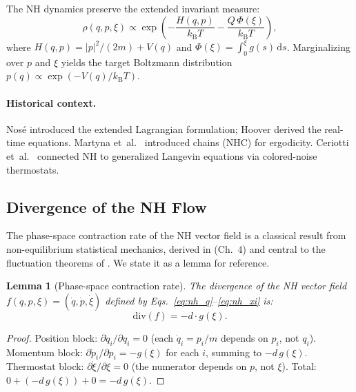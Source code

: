 \documentclass[11pt]{article}
\newtheorem{lemma}[theorem]{Lemma}
\newcommand{\divergence}{\mathrm{div}}
\newcommand{\dd}{\mathrm{d}}
\newcommand{\kT}{k_{\mathrm{B}}T}
\begin{document}
The NH dynamics preserve the extended invariant measure:
\begin{equation}
  \rho(q, p, \xi) \propto
    \exp\!\left(-\frac{H(q,p)}{\kT} - \frac{Q\,\Phi(\xi)}{\kT}\right),
  \label{eq:nh_invariant}
\end{equation}
where $H(q,p) = |p|^2/(2m) + V(q)$ and $\Phi(\xi) = \int_0^\xi g(s)\,\dd s$.
Marginalizing over $p$ and $\xi$ yields the target Boltzmann distribution
$p(q) \propto \exp(-V(q)/\kT)$.

\paragraph{Historical context.}
Nos\'{e} \citep{nose1984unified} introduced the extended Lagrangian formulation;
Hoover \citep{hoover1985canonical} derived the real-time equations. Martyna
et~al.\ \citep{martyna1992nose} introduced chains (NHC) for ergodicity.
Ceriotti et~al.\ \citep{ceriotti2010colored} connected NH to generalized
Langevin equations via colored-noise thermostats.

\subsection{Divergence of the NH Flow}
\label{sec:div_identity}

The phase-space contraction rate of the NH vector field is a classical result
from non-equilibrium statistical mechanics, derived in
\citet{tuckerman2010statistical} (Ch.~4) and central to the fluctuation
theorems of \citet{evans2002fluctuation}. We state it as a lemma for
reference.

\begin{lemma}[Phase-space contraction rate]
\label{lem:exact_div}
The divergence of the NH vector field
$f(q, p, \xi) = (\dot{q}, \dot{p}, \dot{\xi})$ defined by
Eqs.~\eqref{eq:nh_q}--\eqref{eq:nh_xi} is:
\begin{equation}
  \divergence(f) = -d \cdot g(\xi).
  \label{eq:exact_div}
\end{equation}
\end{lemma}

\begin{proof}
Position block: $\partial \dot{q}_i / \partial q_i = 0$ (each $\dot{q}_i =
p_i/m$ depends on $p_i$, not $q_i$). Momentum block: $\partial \dot{p}_i /
\partial p_i = -g(\xi)$ for each $i$, summing to $-d\,g(\xi)$. Thermostat
block: $\partial \dot{\xi} / \partial \xi = 0$ (the numerator depends on $p$,
not $\xi$). Total: $0 + (-d\,g(\xi)) + 0 = -d\,g(\xi)$.
\end{proof}
\end{document}
